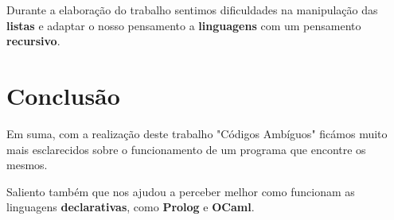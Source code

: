 \documentclass[11pt]{article}   %
\begin{document}
Durante a elaboração do trabalho sentimos dificuldades na manipulação das \textbf{listas} e
adaptar o nosso pensamento a \textbf{linguagens} com um pensamento \textbf{recursivo}.
\section{Conclusão} %
\hspace{0,5cm}Em suma, com a realização deste trabalho "Códigos Ambíguos" ficámos muito mais 
esclarecidos sobre o funcionamento de um programa que encontre os mesmos. \par
Saliento também que nos ajudou a perceber melhor como funcionam as linguagens \textbf{declarativas},
como \textbf{Prolog} e \textbf{OCaml}.
\end{document}
